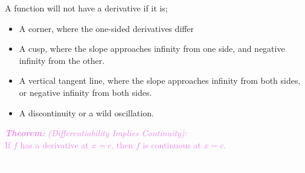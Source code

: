 \documentclass{report}
\newenvironment{theorem}[1][Violet]
  {\begin{tcolorbox}[colframe=#1,colback=white]}
  {\end{tcolorbox}}
\begin{document}
A function will not have a derivative if it is;
\begin{itemize}
    \item A corner, where the one-sided derivatives differ
    \item A cusp, where the slope approaches infinity from one side, and negative infinity from the other.
    \item A vertical tangent line, where the slope approaches infinity from both sides, or negative infinity from both sides.
    \item A discontinuity or a wild oscillation.
\end{itemize}

\begin{theorem}
    \textcolor{Violet}{\textit{\textbf{Theorem:} (Differentiability Implies Continuity):}\\
    If $f$ has a derivative at $x = c$, then $f$ is continuous at $x = c$.}
\end{theorem}

\textcolor{White}{123}
\end{document}
